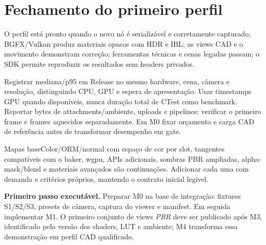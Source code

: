 \documentclass[11pt,a4paper]{article}
\begin{document}
\section{Fechamento do primeiro perfil}

O perfil está pronto quando o novo nó é serializável e corretamente capturado; BGFX/Vulkan produz materiais opacos com HDR e IBL; as views CAD e o movimento demonstram correção; ferramentas técnicas e cenas legadas passam; o SDK permite reproduzir os resultados sem headers privados.

Registrar mediana/p95 em Release no mesmo hardware, cena, câmera e resolução, distinguindo CPU, GPU e espera de apresentação. Usar timestamps GPU quando disponíveis, nunca duração total de CTest como benchmark. Reportar bytes de attachments/ambiente, uploads e pipelines; verificar o primeiro frame e frames aquecidos separadamente. Em M0 fixar orçamento e carga CAD de referência antes de transformar desempenho em gate.

Mapas baseColor/ORM/normal com espaço de cor por slot, tangentes compatíveis com o baker, wgpu, APIs adicionais, sombras PBR ampliadas, alpha-mask/blend e materiais avançados são continuações. Adicionar cada uma com demanda e critérios próprios, mantendo o contrato inicial legível.

\textbf{Primeiro passo executável.} Preparar M0 na base de integração: fixtures S1/S2/S3, presets de câmera, captura do viewer e manifest. Em seguida implementar M1. O primeiro conjunto de views \emph{PBR} deve ser publicado após M3, identificado pela versão dos shaders, LUT e ambiente; M4 transforma essa demonstração em perfil CAD qualificado.
\end{document}
